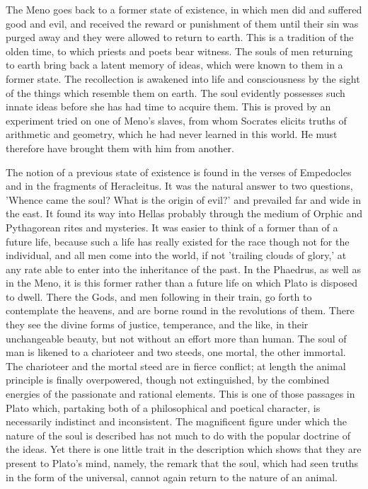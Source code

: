 \documentclass[11pt,letter]{article}
\begin{document}
\par  The Meno goes back to a former state of existence, in which men did and suffered good and evil, and received the reward or punishment of them until their sin was purged away and they were allowed to return to earth. This is a tradition of the olden time, to which priests and poets bear witness. The souls of men returning to earth bring back a latent memory of ideas, which were known to them in a former state. The recollection is awakened into life and consciousness by the sight of the things which resemble them on earth. The soul evidently possesses such innate ideas before she has had time to acquire them. This is proved by an experiment tried on one of Meno's slaves, from whom Socrates elicits truths of arithmetic and geometry, which he had never learned in this world. He must therefore have brought them with him from another.

\par  The notion of a previous state of existence is found in the verses of Empedocles and in the fragments of Heracleitus. It was the natural answer to two questions, 'Whence came the soul? What is the origin of evil?' and prevailed far and wide in the east. It found its way into Hellas probably through the medium of Orphic and Pythagorean rites and mysteries. It was easier to think of a former than of a future life, because such a life has really existed for the race though not for the individual, and all men come into the world, if not 'trailing clouds of glory,' at any rate able to enter into the inheritance of the past. In the Phaedrus, as well as in the Meno, it is this former rather than a future life on which Plato is disposed to dwell. There the Gods, and men following in their train, go forth to contemplate the heavens, and are borne round in the revolutions of them. There they see the divine forms of justice, temperance, and the like, in their unchangeable beauty, but not without an effort more than human. The soul of man is likened to a charioteer and two steeds, one mortal, the other immortal. The charioteer and the mortal steed are in fierce conflict; at length the animal principle is finally overpowered, though not extinguished, by the combined energies of the passionate and rational elements. This is one of those passages in Plato which, partaking both of a philosophical and poetical character, is necessarily indistinct and inconsistent. The magnificent figure under which the nature of the soul is described has not much to do with the popular doctrine of the ideas. Yet there is one little trait in the description which shows that they are present to Plato's mind, namely, the remark that the soul, which had seen truths in the form of the universal, cannot again return to the nature of an animal.
\end{document}

